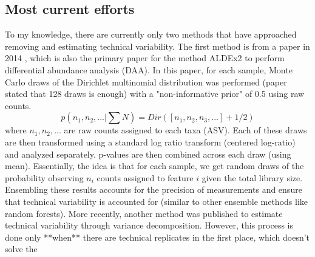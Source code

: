 \documentclass{article}
\begin{document}
\subsection{Most current efforts}
To my knowledge, there are currently only two methods that have approached removing and estimating technical variability. The first method is from a paper in 2014 \cite{fernandes2014}, which is also the primary paper for the method ALDEx2 to perform differential abundance analysis (DAA). In this paper, for each sample, Monte Carlo draws of the Dirichlet multinomial distribution was performed (paper stated that 128 draws is enough) with a "non-informative prior" of 0.5 using raw counts. 
$$p(n_1, n_2,...| \sum N) = Dir([n_1, n_2, n_3, ...] + 1/2)$$ 
where $n_1, n_2, ...$ are raw counts assigned to each taxa (ASV). Each of these draws are then transformed using a standard log ratio transform (centered log-ratio) and analyzed separately. p-values are then combined across each draw (using mean). Essentially, the idea is that for each sample, we get random draws of the probability observing $n_i$ counts assigned to feature $i$ given the total library size. Ensembling these results accounts for the precision of measurements and ensure that technical variability is accounted for (similar to other ensemble methods like random forests). 
More recently, another method was published to estimate technical variability \cite{ji2019} through variance decomposition. However, this process is done only **when** there are technical replicates in the first place, which doesn't solve the  


{}

\end{document}
